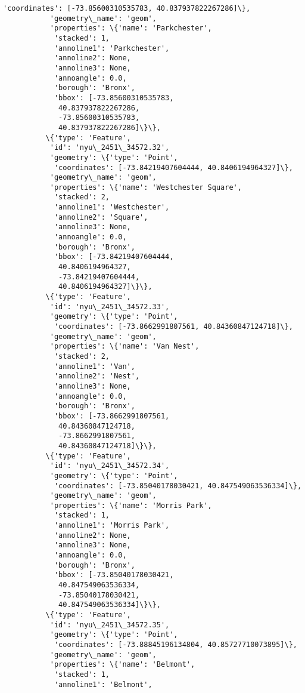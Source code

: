 \documentclass[11pt]{article}
\begin{document}
\begin{Verbatim}[commandchars=\\\{\}]
            'coordinates': [-73.85600310535783, 40.837937822267286]\},
           'geometry\_name': 'geom',
           'properties': \{'name': 'Parkchester',
            'stacked': 1,
            'annoline1': 'Parkchester',
            'annoline2': None,
            'annoline3': None,
            'annoangle': 0.0,
            'borough': 'Bronx',
            'bbox': [-73.85600310535783,
             40.837937822267286,
             -73.85600310535783,
             40.837937822267286]\}\},
          \{'type': 'Feature',
           'id': 'nyu\_2451\_34572.32',
           'geometry': \{'type': 'Point',
            'coordinates': [-73.84219407604444, 40.8406194964327]\},
           'geometry\_name': 'geom',
           'properties': \{'name': 'Westchester Square',
            'stacked': 2,
            'annoline1': 'Westchester',
            'annoline2': 'Square',
            'annoline3': None,
            'annoangle': 0.0,
            'borough': 'Bronx',
            'bbox': [-73.84219407604444,
             40.8406194964327,
             -73.84219407604444,
             40.8406194964327]\}\},
          \{'type': 'Feature',
           'id': 'nyu\_2451\_34572.33',
           'geometry': \{'type': 'Point',
            'coordinates': [-73.8662991807561, 40.84360847124718]\},
           'geometry\_name': 'geom',
           'properties': \{'name': 'Van Nest',
            'stacked': 2,
            'annoline1': 'Van',
            'annoline2': 'Nest',
            'annoline3': None,
            'annoangle': 0.0,
            'borough': 'Bronx',
            'bbox': [-73.8662991807561,
             40.84360847124718,
             -73.8662991807561,
             40.84360847124718]\}\},
          \{'type': 'Feature',
           'id': 'nyu\_2451\_34572.34',
           'geometry': \{'type': 'Point',
            'coordinates': [-73.85040178030421, 40.847549063536334]\},
           'geometry\_name': 'geom',
           'properties': \{'name': 'Morris Park',
            'stacked': 1,
            'annoline1': 'Morris Park',
            'annoline2': None,
            'annoline3': None,
            'annoangle': 0.0,
            'borough': 'Bronx',
            'bbox': [-73.85040178030421,
             40.847549063536334,
             -73.85040178030421,
             40.847549063536334]\}\},
          \{'type': 'Feature',
           'id': 'nyu\_2451\_34572.35',
           'geometry': \{'type': 'Point',
            'coordinates': [-73.88845196134804, 40.85727710073895]\},
           'geometry\_name': 'geom',
           'properties': \{'name': 'Belmont',
            'stacked': 1,
            'annoline1': 'Belmont',

\end{Verbatim}
\end{document}
